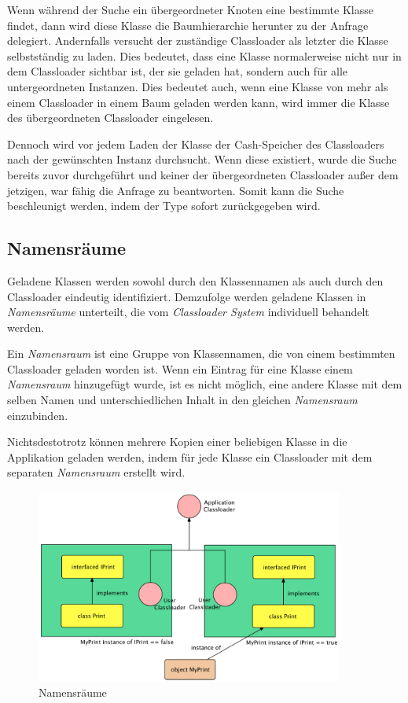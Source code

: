     Wenn während der Suche ein übergeordneter Knoten eine bestimmte Klasse findet, dann wird diese Klasse die Baumhierarchie herunter zu der Anfrage delegiert. Andernfalls versucht der zuständige Classloader als letzter die Klasse selbstständig zu laden. Dies bedeutet, dass eine Klasse normalerweise nicht nur in dem Classloader sichtbar ist, der sie geladen hat, sondern auch für alle untergeordneten Instanzen. Dies bedeutet auch, wenn eine Klasse von mehr als einem Classloader in einem Baum geladen werden kann, wird immer die Klasse des übergeordneten Classloader eingelesen.

    Dennoch wird vor jedem Laden der Klasse der Cash-Speicher des Classloaders nach der gewünschten Instanz durchsucht. Wenn diese existiert, wurde die Suche bereits zuvor durchgeführt und keiner der übergeordneten Classloader außer dem jetzigen, war fähig die Anfrage zu beantworten. Somit kann die Suche beschleunigt werden, indem der Type sofort zurückgegeben wird.

  \subsection{Namensräume} \label{sec:Namensräume}
    Geladene Klassen werden sowohl durch den Klassennamen als auch durch den Classloader eindeutig identifiziert. Demzufolge werden geladene Klassen in \textit{Namensräume} unterteilt, die vom \textit{Classloader System} individuell behandelt werden.

    Ein \textit{Namensraum} ist eine Gruppe von Klassennamen, die von einem bestimmten Classloader geladen worden ist. Wenn ein Eintrag für eine Klasse einem \textit{Namensraum} hinzugefügt wurde, ist es nicht möglich, eine andere Klasse mit dem selben Namen und unterschiedlichen Inhalt in den gleichen \textit{Namensraum} einzubinden. 

    Nichtsdestotrotz können mehrere Kopien einer beliebigen Klasse in die Applikation geladen werden, indem für jede Klasse ein Classloader mit dem separaten \textit{Namensraum} erstellt wird. 
    \begin{figure}[h]
      \centering
      \includegraphics[width=0.9\textwidth]{material/images/namespaces.png}
      \caption{Namensräume}
      \label{fig:namespaces}
    \end{figure}

